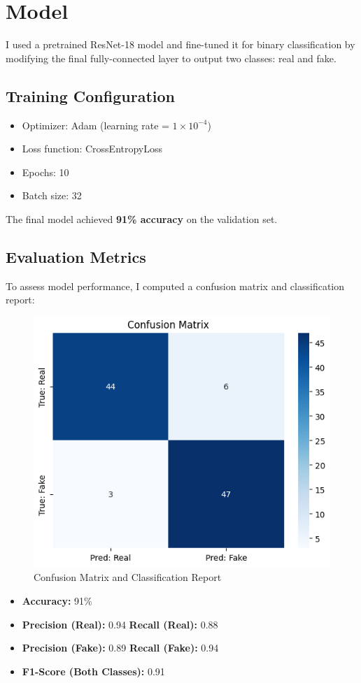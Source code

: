 \documentclass{article}
\begin{document}
\section{Model}
I used a pretrained ResNet-18 model and fine-tuned it for binary classification by modifying the final fully-connected layer to output two classes: real and fake.

\subsection*{Training Configuration}
\begin{itemize}
    \item Optimizer: Adam (learning rate = $1 \times 10^{-4}$)
    \item Loss function: CrossEntropyLoss
    \item Epochs: 10
    \item Batch size: 32
\end{itemize}

The final model achieved \textbf{91\% accuracy} on the validation set.

\subsection*{Evaluation Metrics}
To assess model performance, I computed a confusion matrix and classification report:

\begin{figure}[h]
    \centering
    \includegraphics[width=0.6\linewidth]{img/confusion_matrix.png}
    \caption{Confusion Matrix and Classification Report}
\end{figure}

\begin{itemize}
    \item \textbf{Accuracy:} 91\%
    \item \textbf{Precision (Real):} 0.94 \quad \textbf{Recall (Real):} 0.88
    \item \textbf{Precision (Fake):} 0.89 \quad \textbf{Recall (Fake):} 0.94
    \item \textbf{F1-Score (Both Classes):} 0.91
\end{itemize}
\end{document}
